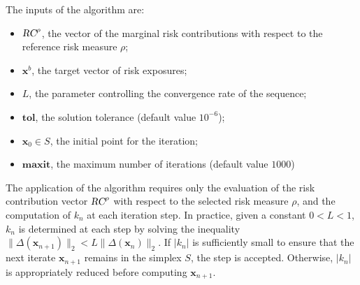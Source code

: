 \documentclass[preprint,11pt,authoryear]{elsarticle}
\begin{document}
The inputs of the algorithm are:
\begin{itemize}
	 \item $\textsl{RC}^{\rho}$, the vector of the marginal risk contributions with respect to the reference risk measure $\rho$;
	 \item $\mathbf{x}^b$, the target vector of risk exposures; 
	 \item $L$, the parameter controlling the convergence rate of the sequence;
	 \item $\textbf{tol}$, the solution tolerance (default value $10^{-6}$);
	 \item $\mathbf{x}_0 \in S$, the initial point for the iteration;
	 \item $\textbf{maxit}$, the maximum number of iterations (default value $1000$)
\end{itemize}

The application of the algorithm requires only the evaluation of the risk contribution vector $\textsl{RC}^{\rho}$ with respect to the selected risk measure $\rho$, and the computation of $k_n$ at each iteration step. In practice, given a constant $0<L<1$, $k_n$ is determined at each step by solving the inequality $\| \Delta(\mathbf{x}_{n+1}) \|_2 < L \| \Delta(\mathbf{x}_n) \|_2$. If $|k_n|$ is sufficiently small to ensure that the next iterate $\mathbf{x}_{n+1}$ remains in the simplex $S$, the step is accepted. Otherwise, $|k_n|$ is appropriately reduced before computing $\mathbf{x}_{n+1}$. 
\end{document}
